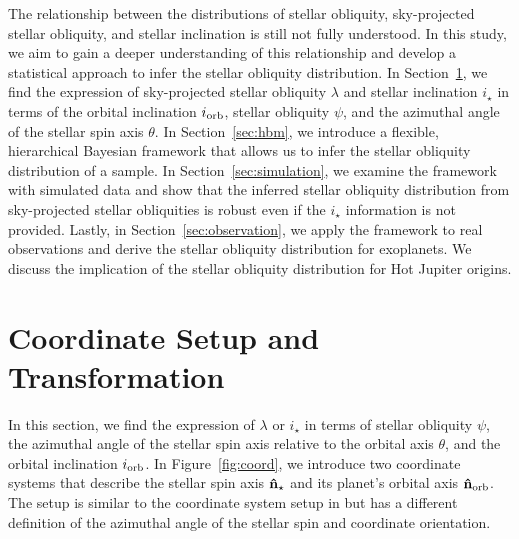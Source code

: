 \documentclass[twocolumn,times]{aastex631}
\begin{document}
The relationship between the distributions of stellar obliquity, sky-projected stellar obliquity, and stellar inclination is still not fully understood. In this study, we aim to gain a deeper understanding of this relationship and develop a statistical approach to infer the stellar obliquity distribution.
In Section~\ref{sec:coords}, we find the expression of sky-projected stellar obliquity $\lambda$ and stellar inclination $i_\star$ in terms of the orbital inclination $i_{\rm orb}$, stellar obliquity $\psi$, and the azimuthal angle of the stellar spin axis $\theta$.
In Section~\ref{sec:hbm}, we introduce a flexible, hierarchical Bayesian framework that allows us to infer the stellar obliquity distribution of a sample.
In Section~\ref{sec:simulation}, we examine the framework with simulated data and show that the inferred stellar obliquity distribution from sky-projected stellar obliquities is robust even if the $i_\star$ information is not provided.
Lastly, in Section~\ref{sec:observation}, we apply the framework to real observations and derive the stellar obliquity distribution for exoplanets. We discuss the implication of the stellar obliquity distribution for Hot Jupiter origins.

\section{Coordinate Setup and Transformation}\label{sec:coords}

In this section, we find the expression of $\lambda$ or $i_\star$ in terms of stellar obliquity $\psi$, the azimuthal angle of the stellar spin axis relative to the orbital axis $\theta$, and the orbital inclination $i_{\rm orb}$. In Figure~\ref{fig:coord}, we introduce two coordinate systems that describe the stellar spin axis $\vb{\hat{n}_\star}$ and its planet's orbital axis $\vb{\hat{n}_{\rm orb}}$. The setup is similar to the coordinate system setup in \cite{Fabrycky09} but has a different definition of the azimuthal angle of the stellar spin and coordinate orientation.
\end{document}
